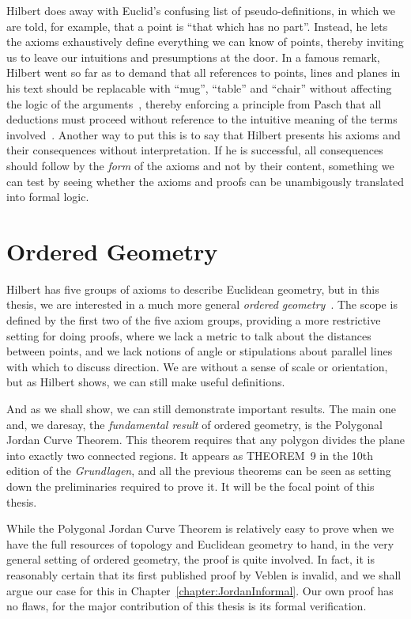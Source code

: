 Hilbert does away with Euclid's confusing list of pseudo-definitions, in which we are told, for example, that a point is ``that which has no part''. Instead, he lets the axioms exhaustively define everything we can know of points, thereby inviting us to leave our intuitions and presumptions at the door. In a famous remark, Hilbert went so far as to demand that all references to points, lines and planes in his text should be replacable with ``mug'', ``table'' and ``chair'' without affecting the logic of the arguments~\cite{TableChairMug}, thereby enforcing a principle from Pasch that all deductions must proceed without reference to the intuitive meaning of the terms involved~\cite{PaschToPeano}. Another way to put this is to say that Hilbert presents his axioms and their consequences without interpretation. If he is successful, all consequences should follow by the \emph{form} of the axioms and not by their content, something we can test by seeing whether the axioms and proofs can be unambigously translated into formal logic.

\section{Ordered Geometry}
Hilbert has five groups of axioms to describe Euclidean geometry, but in this thesis, we are interested in a much more general \emph{ordered geometry}~\cite{AxiomaticsOrderedGeometry}. The scope is defined by the first two of the five axiom groups, providing a more restrictive setting for doing proofs, where we lack a metric to talk about the distances between points, and we lack notions of angle or stipulations about parallel lines with which to discuss direction. We are without a sense of scale or orientation, but as Hilbert shows, we can still make useful definitions.

And as we shall show, we can still demonstrate important results. The main one and, we daresay, the \emph{fundamental result} of ordered geometry, is the Polygonal Jordan Curve Theorem. This theorem requires that any polygon divides the plane into exactly two connected regions. It appears as THEOREM~9 in the 10th edition of the \emph{Grundlagen}, and all the previous theorems can be seen as setting down the preliminaries required to prove it. It will be the focal point of this thesis.

While the Polygonal Jordan Curve Theorem is relatively easy to prove when we have the full resources of topology and Euclidean geometry to hand, in the very general setting of ordered geometry, the proof is quite involved. In fact, it is reasonably certain that its first published proof by Veblen is invalid, and we shall argue our case for this in Chapter~\ref{chapter:JordanInformal}. Our own proof has no flaws, for the major contribution of this thesis is its formal verification.

